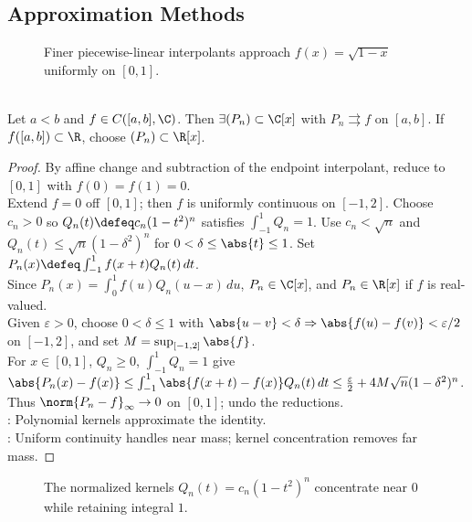 \subsection{Approximation Methods}

\begin{figure}[H]
  \centering
  
  \caption{Finer piecewise-linear interpolants approach $f(x)=\sqrt{1-x}$ uniformly on $[0,1]$.}
  \label{fig:polygonal-approximation-sqrt-one-minus-x}
\end{figure}

\begin{theorem} \label{thm:weierstrass-polynomial-approximation}\label{thm:power-approx-fourier-main-source-todo} \\
Let $a<b$ and $f\in C([a,b],\C)$. Then $\exists (P_n)\subset\C[x]$ with $P_n\rightrightarrows f$ on $[a,b]$. If $f([a,b])\subset\R$, choose $(P_n)\subset\R[x]$.
\begin{proof} By affine change and subtraction of the endpoint interpolant, reduce to $[0,1]$ with $f(0)=f(1)=0$.\\
Extend $f=0$ off $[0,1]$; then $f$ is uniformly continuous on $[-1,2]$. Choose $c_n>0$ so $Q_n(t)\defeq c_n(1-t^2)^n$ satisfies $\int_{-1}^{1}Q_n=1$. Use $c_n<\sqrt n$ and $Q_n(t)\leq\sqrt n(1-\delta^2)^n$ for $0<\delta\leq\abs{t}\leq1$. Set $P_n(x)\defeq\int_{-1}^{1}f(x+t)Q_n(t)\,dt$.\\
Since $P_n(x)=\int_0^1 f(u)Q_n(u-x)\,du$, $P_n\in\C[x]$, and $P_n\in\R[x]$ if $f$ is real-valued.\\
Given $\varepsilon>0$, choose $0<\delta\leq1$ with $\abs{u-v}<\delta\Rightarrow\abs{f(u)-f(v)}<\varepsilon/2$ on $[-1,2]$, and set $M=\sup_{[-1,2]}\abs{f}$.\\
For $x\in[0,1]$, $Q_n\geq0$, $\int_{-1}^{1}Q_n=1$ give $\abs{P_n(x)-f(x)}\leq\int_{-1}^{1}\abs{f(x+t)-f(x)}Q_n(t)\,dt\leq\frac{\varepsilon}{2}+4M\sqrt n(1-\delta^2)^n$.\\
Thus $\norm{P_n-f}_\infty\to0$ on $[0,1]$; undo the reductions.\\
: Polynomial kernels approximate the identity.\\
: Uniform continuity handles near mass; kernel concentration removes far mass.
\end{proof}
\end{theorem}

\begin{figure}[H]
  \centering
  
  \caption{The normalized kernels $Q_n(t)=c_n(1-t^2)^n$ concentrate near $0$ while retaining integral $1$.}
  \label{fig:polynomial-bump-kernel}
\end{figure}

